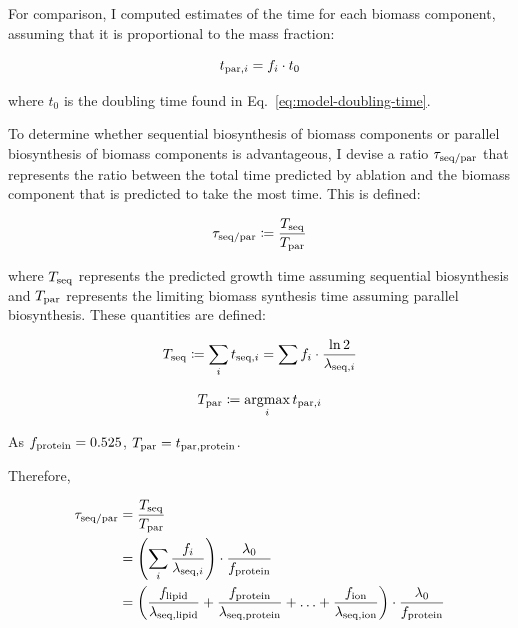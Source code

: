 For comparison, I computed estimates of the time for each biomass component, assuming that it is proportional to the mass fraction:

\begin{equation}
  t_{\mathrm{par},i} = f_{i} \cdot t_{0}
  \label{eq:model-proportional-time}
\end{equation}

where $t_{0}$ is the doubling time found in Eq.\ \ref{eq:model-doubling-time}.

To determine whether sequential biosynthesis of biomass components or parallel biosynthesis of biomass components is advantageous, I devise a ratio $\tau_{\mathrm{seq}/\mathrm{par}}$ that represents the ratio between the total time predicted by ablation and the biomass component that is predicted to take the most time.
This is defined:

\begin{equation}
  \tau_{\mathrm{seq}/\mathrm{par}} \coloneqq \frac{T_{\mathrm{seq}}}{T_{\mathrm{par}}}
  \label{eq:model-ratio-simplified}
\end{equation}

where $T_{\mathrm{seq}}$ represents the predicted growth time assuming sequential biosynthesis and $T_{\mathrm{par}}$ represents the limiting biomass synthesis time assuming parallel biosynthesis.
These quantities are defined:

\begin{equation}
  T_{\mathrm{seq}} \coloneqq \sum_{i} t_{\mathrm{seq},i} = \sum f_{i} \cdot \frac{\ln 2}{\lambda_{\mathrm{seq},i}}
  \label{eq:model-a}
\end{equation}


\begin{equation}
  T_{\mathrm{par}} \coloneqq \operatorname*{argmax}_{i} t_{\mathrm{par},i}
  \label{eq:model-b}
\end{equation}

As $f_{\mathrm{protein}} = 0.525$, $T_{\mathrm{par}} = t_{\mathrm{par},\mathrm{protein}}$.

Therefore,

\begin{equation}
  \begin{aligned}
    \tau_{\mathrm{seq}/\mathrm{par}} &= \frac{T_{\mathrm{seq}}}{T_{\mathrm{par}}} \\
    & = \left( \sum_i \frac{f_i}{\lambda_{\mathrm{seq},i}} \right) \cdot \frac{\lambda_{0}}{f_{\mathrm{protein}}} \\
    & = \left( \frac{f_{\mathrm{lipid}}}{\lambda_{\mathrm{seq},\mathrm{lipid}}} + \frac{f_{\mathrm{protein}}}{\lambda_{\mathrm{seq},\mathrm{protein}}} + \ldots + \frac{f_{\mathrm{ion}}}{\lambda_{\mathrm{seq},\mathrm{ion}}} \right) \cdot \frac{\lambda_{0}}{f_{\mathrm{protein}}}
    \end{aligned}
  \label{eq:model-ratio}
\end{equation}

